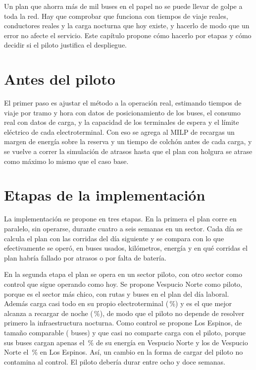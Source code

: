 
Un plan que ahorra más de mil buses en el papel no se puede llevar de golpe a toda la red. Hay que comprobar que funciona con tiempos de viaje reales, conductores reales y la carga nocturna que hoy existe, y hacerlo de modo que un error no afecte el servicio. Este capítulo propone cómo hacerlo por etapas y cómo decidir si el piloto justifica el despliegue.

\section{Antes del piloto}
\label{sec:antes-piloto}

El primer paso es ajustar el método a la operación real, estimando tiempos de viaje por tramo y hora con datos de posicionamiento de los buses, el consumo real con datos de carga, y la capacidad de los terminales de espera y el límite eléctrico de cada electroterminal. Con eso se agrega al MILP de recargas un margen de energía sobre la reserva y un tiempo de colchón antes de cada carga, y se vuelve a correr la simulación de atrasos hasta que el plan con holgura se atrase como máximo lo mismo que el caso base.

\section{Etapas de la implementación}
\label{sec:etapas}

La implementación se propone en tres etapas. En la primera el plan corre en paralelo, sin operarse, durante cuatro a seis semanas en un sector. Cada día se calcula el plan con las corridas del día siguiente y se compara con lo que efectivamente se operó, en buses usados, kilómetros, energía y en qué corridas el plan habría fallado por atrasos o por falta de batería.

En la segunda etapa el plan se opera en un sector piloto, con otro sector como control que sigue operando como hoy. Se propone Vespucio Norte como piloto, porque es el sector más chico, con \RutasSectorUno{} rutas y \BusesPlanSectorUno{} buses en el plan del día laboral. Además carga casi todo en su propio electroterminal (\PctCargaPropiaUno\,\%) y es el que mejor alcanza a recargar de noche (\ReposMejorPct\,\%), de modo que el piloto no depende de resolver primero la infraestructura nocturna. Como control se propone Los Espinos, de tamaño comparable (\BusesPlanSectorTres{} buses) y que casi no comparte carga con el piloto, porque sus buses cargan apenas el \PctEspinosEnUno\,\% de su energía en Vespucio Norte y los de Vespucio Norte el \PctVespucioEnTres\,\% en Los Espinos. Así, un cambio en la forma de cargar del piloto no contamina al control. El piloto debería durar entre ocho y doce semanas.

